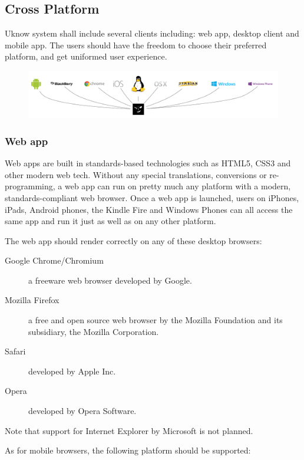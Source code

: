 
\subsection{Cross Platform}

Uknow system shall include several clients including: web app, desktop client and mobile app.
The users should have the freedom to choose their preferred platform, and get uniformed user experience.

\begin{figure}[H]
  \centering
  \includegraphics[width=\textwidth]{img/platforms.png}
\end{figure}

\subsubsection{Web app}

Web apps are built in standards-based technologies such as HTML5,
CSS3 and other modern web tech.  Without any special translations,
conversions or re-programming, a web app can run on pretty much any platform with a modern,
standards-compliant web browser. Once a web app is launched, users on iPhones, iPads, Android phones,
the Kindle Fire and Windows Phones can all access the same app and run it just as well as on any other platform.

The web app should render correctly on any of these desktop browsers:

\begin{description}
\item[Google Chrome/Chromium] a freeware web browser developed by Google.
\item[Mozilla Firefox] a free and open source web browser by the Mozilla Foundation and its subsidiary, the Mozilla Corporation.
\item[Safari] developed by Apple Inc.
\item[Opera] developed by Opera Software.
\end{description}

Note that support for Internet Explorer by Microsoft is not planned.

As for mobile browsers, the following platform should be supported:

